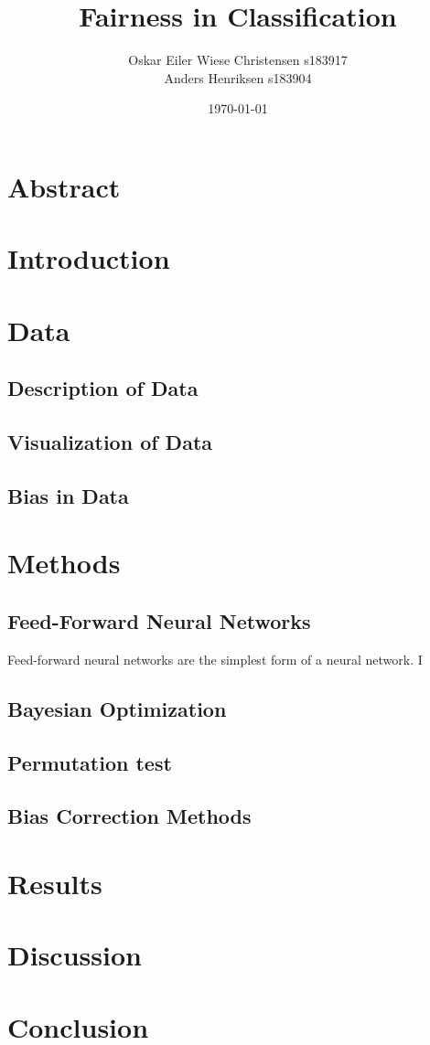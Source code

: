 \documentclass[11pt, fleqn, titlepage]{article}
\title{Fairness in Classification}
\author{Oskar Eiler Wiese Christensen s183917 \\ Anders Henriksen s183904}
\date{\today}
\begin{document}
	
	\maketitle
	\tableofcontents \newpage
	\section{Abstract}
	
	
	\section{Introduction}
	
	
	
	\section{Data}
	
	\subsection{Description of Data}
	
	\subsection{Visualization of Data}
	
	\subsection{Bias in Data}
	
	\section{Methods}
	 
	\subsection{Feed-Forward Neural Networks}
	Feed-forward neural networks are the simplest form of a neural network. I
	 
	\subsection{Bayesian Optimization}
	
	\subsection{Permutation test}
	
	\subsection{Bias Correction Methods}
	
	\section{Results}
	
	
	\section{Discussion}
	
	
	\section{Conclusion}
	
	
\end{document}
